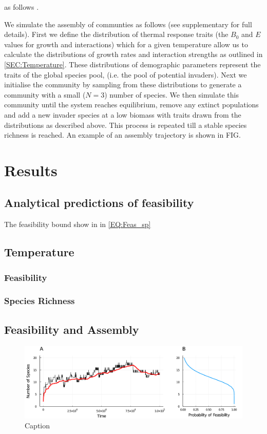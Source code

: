 \documentclass{article}
\begin{document}
as follows . 

We simulate the assembly of communties as follows (see supplementary for full details). First we define the distribution of thermal response traits (the $B_0$ and $E$ values for growth and interactions) which for a given temperature allow us to calculate the distributions of growth rates and interaction strengths as outlined in \cref{SEC:Temperature}. These distributions of demographic parameters represent the traits of the global species pool, (i.e. the pool of potential invaders). Next we initialise the community by sampling from these distributions to generate a community with a small ($N=3$) number of species. We then simulate this community until the system reaches equilibrium, remove any extinct populations and add a new invader species at a low biomass with traits drawn from the distributions as described above. This process is repeated till a stable species richness is reached. An example of an assembly trajectory is shown in FIG. 

\section{Results}
\subsection{Analytical predictions of feasibility}

The feasibility bound show in in \cref{EQ:Feas_sp} 



\subsection{Temperature}

\subsubsection{Feasibility}

\subsubsection{Species Richness}

\subsection{Feasibility and Assembly}

\begin{figure}
    \centering
    \includegraphics[width = \textwidth]{docs/Figures/Fig_3.pdf}
    \caption{Caption}
    \label{Fig:Assembly_Example}
\end{figure}
\end{document}
